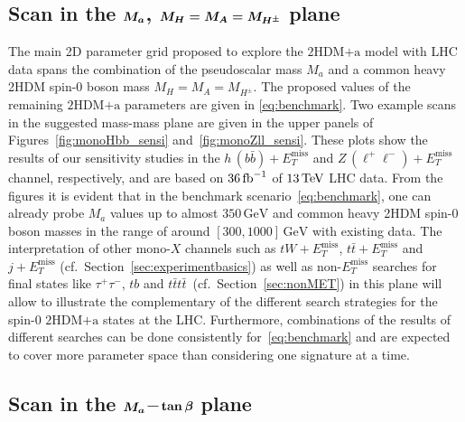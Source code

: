 \documentclass[review]{elsarticle}
\newcommand{\MET}{\ensuremath{E_T^\mathrm{miss}}\xspace}
\newcommand{\mA}{\ensuremath{M_{A}}\xspace}
\newcommand{\ma}{\ensuremath{M_{a}}\xspace}
\newcommand{\mH}{\ensuremath{M_{H}}\xspace}
\newcommand{\mHc}{\ensuremath{M_{H^{\pm}}}\xspace}
\newcommand{\hdma}{\ensuremath{\textrm{2HDM+a}}\xspace}
\def\bm#1{\mbox{\boldmath$#1$\unboldmath}}
\begin{document}
\subsection[Scan in the $\ma$,  $\mH = \mA = \mHc$ plane]{Scan in the $\bm{\ma}$,  $\bm{\mH = \mA = \mHc}$ plane}

The main 2D parameter grid proposed to explore the \hdma model with LHC data spans the combination of the pseudoscalar mass $\ma$ and a common heavy 2HDM  spin-0 boson  mass $\mH = \mA = \mHc$. The proposed values of the remaining \hdma parameters are given in \eqref{eq:benchmark}. Two example scans in the suggested mass-mass plane are given in the upper panels of Figures~\ref{fig:monoHbb_sensi} and~\ref{fig:monoZll_sensi}. These plots show the results of our sensitivity studies in the $h \, (b \bar b) + \MET$ and $Z \, (\ell^+ \ell^-) + \MET$ channel, respectively, and are based on $36 \, {\rm fb}^{-1}$ of $13 \, {\rm TeV}$ LHC data.  From the figures it is evident that in the benchmark scenario~\eqref{eq:benchmark}, one can already probe $M_a$ values  up to almost $350 \, {\mathrm{GeV}}$ and common heavy 2HDM  spin-0 boson  masses in the range of around $[300, 1000] \, {\mathrm{GeV}}$ with existing data.  The interpretation of other mono-$X$ channels such as $t W + \MET$, $t \bar t + \MET$ and $j + \MET$ (cf.~Section~\ref{sec:experimentbasics}) as well as non-$\MET$ searches for final states like $\tau^+ \tau^-$, $tb$ and  $t \bar t t \bar t$~(cf.~Section~\ref{sec:nonMET}) in this plane will allow to  illustrate the complementary of the different search strategies for the spin-0 \hdma states at the LHC. Furthermore, combinations of the results of different searches can be done consistently for~\eqref{eq:benchmark} and are expected to cover more parameter space than considering one signature at a time. 

\subsection[Scan in the $\ma\hspace{0.5mm}$--$\hspace{0.5mm} \tan \beta$ plane]{Scan in the $\bm{\ma}\hspace{0.5mm}$--$\hspace{0.5mm} \bm{\tan \beta}$ plane}
\end{document}
